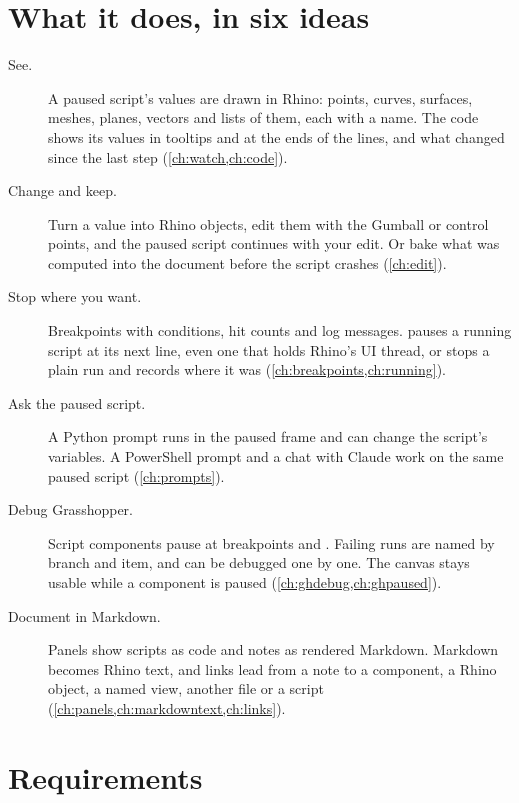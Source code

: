 \section{What it does, in six ideas}

\begin{description}
  \item[See.] A paused script's values are drawn in Rhino: points, curves, surfaces, meshes, planes,
    vectors and lists of them, each with a name. The code shows its values in tooltips and at the ends
    of the lines, and what changed since the last step (\cref{ch:watch,ch:code}).
  \item[Change and keep.] Turn a value into Rhino objects, edit them with the Gumball or control
    points, and the paused script continues with your edit. Or bake what was computed into the
    document before the script crashes (\cref{ch:edit}).
  \item[Stop where you want.] Breakpoints with conditions, hit counts and log messages. 
    pauses a running script at its next line, even one that holds Rhino's UI thread, or stops a
    plain run and records where it was (\cref{ch:breakpoints,ch:running}).
  \item[Ask the paused script.] A Python prompt runs in the paused frame and can change the script's
    variables. A PowerShell prompt and a chat with Claude work on the same paused script
    (\cref{ch:prompts}).
  \item[Debug Grasshopper.] Script components pause at breakpoints and . Failing runs
    are named by branch and item, and can be debugged one by one. The canvas stays usable while a
    component is paused (\cref{ch:ghdebug,ch:ghpaused}).
  \item[Document in Markdown.] Panels show scripts as code and notes as rendered Markdown. Markdown
    becomes Rhino text, and links lead from a note to a component, a Rhino object, a named view,
    another file or a script (\cref{ch:panels,ch:markdowntext,ch:links}).
\end{description}

\section{Requirements}

